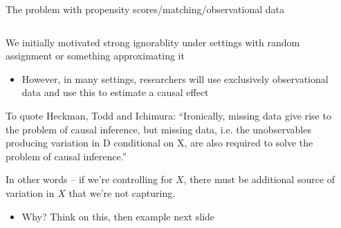 \documentclass[notes,11pt, aspectratio=169]{beamer}
\newenvironment{wideitemize}{\itemize\addtolength{\itemsep}{10pt}}{\enditemize}
\begin{document}
\begin{frame}{The problem with propensity scores/matching/observational data}
\begin{columns}[T] %
\begin{column}{.7\textwidth}
  \begin{wideitemize}
  \item We initially motivated strong ignorablity under settings with
    random assignment or something approximating it
    \begin{itemize}
    \item However, in many settings, researchers will use exclusively
      observational data and use this to estimate a causal effect
    \end{itemize}
  \item To quote Heckman, Todd and Ichimura: ``Ironically, missing data give rise to the problem of causal inference, but missing data, i.e. the unobservables producing variation in D conditional on X, are also required to solve the problem of causal inference.''
  \item In other words -- if we're controlling for $X$, there must be additional source of variation in $X$ that we're not capturing.
    \begin{itemize}
    \item Why? Think on this, then example next slide
    \end{itemize}
    \end{wideitemize}
\end{column}%
\hfill%
\begin{column}{.4\textwidth}
  \begin{center}
  \end{center}
\end{column}%
\end{columns}
\end{frame}
\end{document}
